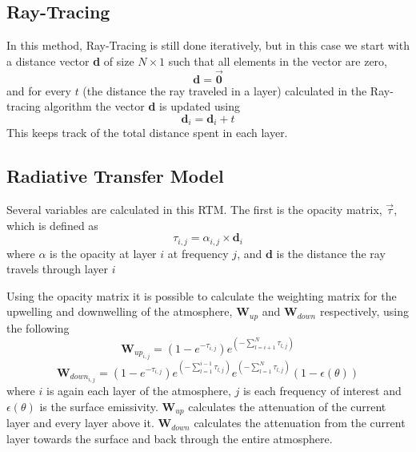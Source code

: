 \subsection{Ray-Tracing}
In this method, Ray-Tracing is still done iteratively, but in this case we start with a distance vector \textbf{d} of size $N \times 1$ such that all elements in the vector are zero,
\begin{equation*}
\textbf{d} = \vec{\textbf{0}}
\end{equation*}
and for every $t$ (the distance the ray traveled in a layer) calculated in the Ray-tracing algorithm the vector \textbf{d} is updated using
\begin{equation}
\textbf{d}_i = \textbf{d}_i + t 
\end{equation}
This keeps track of the total distance spent in each layer.

\subsection{Radiative Transfer Model}

Several variables are calculated in this RTM. The first is the opacity matrix, $\vec{\tau}$, which is defined as
\begin{equation}
\tau_{i,j} = \alpha_{i,j} \times \textbf{d}_i
\end{equation}
where $\alpha$ is the opacity at layer $i$ at frequency $j$, and $\textbf{d}$ is the distance the ray travels through layer $i$

Using the opacity matrix it is possible to calculate the weighting matrix for the upwelling and downwelling of the atmosphere, $\textbf{W}_{up}$ and $\textbf{W}_{down}$ respectively, using the following
\begin{equation}
\textbf{W}_{up_{i,j}} = (1-e^{-\tau_{i,j}})e^{\left(-\sum_{l=i+1}^N \tau_{l,j}\right)}
\end{equation}
\begin{equation}
\textbf{W}_{down_{i,j}} = (1-e^{-\tau_{i,j}})e^{\left(-\sum_{l=1}^{i-1} \tau_{l,j}\right)} e^{\left(-\sum_{l=1}^{N} \tau_{l,j}\right)} (1- \epsilon(\theta))
\end{equation}
where $i$ is again each layer of the atmosphere, $j$ is each frequency of interest and $\epsilon(\theta)$ is the surface emissivity. $\textbf{W}_{up}$ calculates the attenuation of the current layer and every layer above it. $\textbf{W}_{down}$ calculates the attenuation from the current layer towards the surface and back through the entire atmosphere. 

